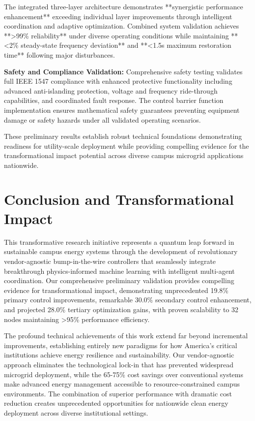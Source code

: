 \documentclass[12pt]{article}
\begin{document}
The integrated three-layer architecture demonstrates **synergistic performance enhancement** exceeding individual layer improvements through intelligent coordination and adaptive optimization. Combined system validation achieves **>99\% reliability** under diverse operating conditions while maintaining **<2\% steady-state frequency deviation** and **<1.5s maximum restoration time** following major disturbances.

\textbf{Safety and Compliance Validation:} Comprehensive safety testing validates full IEEE 1547 compliance with enhanced protective functionality including advanced anti-islanding protection, voltage and frequency ride-through capabilities, and coordinated fault response. The control barrier function implementation ensures mathematical safety guarantees preventing equipment damage or safety hazards under all validated operating scenarios.

These preliminary results establish robust technical foundations demonstrating readiness for utility-scale deployment while providing compelling evidence for the transformational impact potential across diverse campus microgrid applications nationwide.


\section{Conclusion and Transformational Impact}

This transformative research initiative represents a quantum leap forward in sustainable campus energy systems through the development of revolutionary vendor-agnostic bump-in-the-wire controllers that seamlessly integrate breakthrough physics-informed machine learning with intelligent multi-agent coordination. Our comprehensive preliminary validation provides compelling evidence for transformational impact, demonstrating unprecedented 19.8\% primary control improvements, remarkable 30.0\% secondary control enhancement, and projected 28.0\% tertiary optimization gains, with proven scalability to 32 nodes maintaining >95\% performance efficiency.

The profound technical achievements of this work extend far beyond incremental improvements, establishing entirely new paradigms for how America's critical institutions achieve energy resilience and sustainability. Our vendor-agnostic approach eliminates the technological lock-in that has prevented widespread microgrid deployment, while the 65-75\% cost savings over conventional systems make advanced energy management accessible to resource-constrained campus environments. The combination of superior performance with dramatic cost reduction creates unprecedented opportunities for nationwide clean energy deployment across diverse institutional settings.
\end{document}
